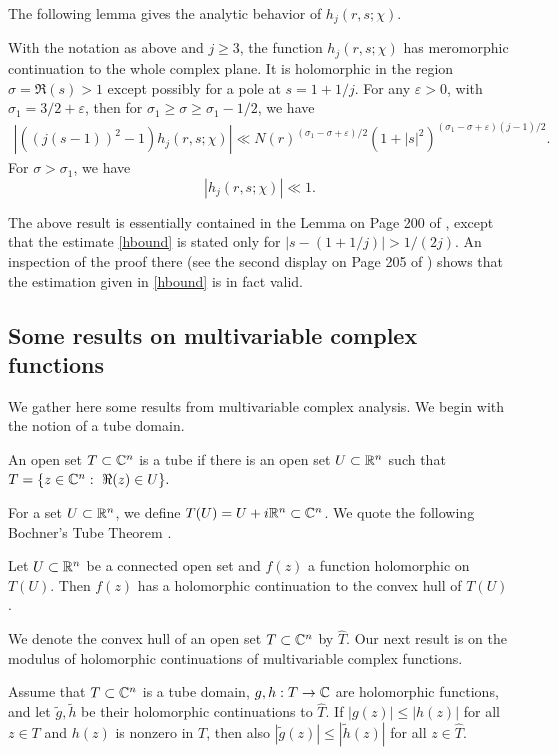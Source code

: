 \documentclass[twoside,leqno,10pt, A4]{amsart}
\begin{document}
    The following lemma gives the analytic behavior of $h_j(r,s;\chi)$.
 \begin{lemma}
\label{lem1} With the notation as above and $j \geq 3$, the function $h_j(r,s;\chi)$ has meromorphic continuation to the whole complex plane. It
is holomorphic in the region $\sigma=\Re(s) > 1$ except possibly for a pole at $s = 1+1/j$. For any $\varepsilon>0$, with $\sigma_1 = 3/2+\varepsilon$,
then for $\sigma_1 \geq \sigma \geq \sigma_1- 1/2$, we have
\begin{align}
\label{hbound}
  |((j(s-1))^2-1)h_j(r,s;\chi)| \ll N(r)^{(\sigma_1-\sigma+\varepsilon)/2}(1+|s|^2)^{(\sigma_1-\sigma+\varepsilon)(j-1)/2}.
\end{align}
  For $\sigma >\sigma_1$, we have
\begin{equation*}
  |h_j(r,s;\chi)| \ll 1.
\end{equation*}
\end{lemma}

The above result is essentially contained in the Lemma on Page 200 of \cite{P}, except that the estimate \eqref{hbound} is stated only for $|s-(1+1/j)|>1/(2j)$.  An inspection of the proof there  (see the second display on Page 205 of \cite{P}) shows that the estimation given in \eqref{hbound} is in fact valid.

\subsection{Some results on multivariable complex functions}
	
We gather here some results from multivariable complex analysis. We begin with the notion of a tube domain.
\begin{defin}
		An open set $T\subset\mathbb C^n$ is a tube if there is an open set $U\subset\mathbb R^n$ such that $T=\{z\in\mathbb C^n:\ \Re(z)\in U\}.$
\end{defin}
	
   For a set $U\subset\mathbb R^n$, we define $T(U)=U+i\mathbb R^n\subset \mathbb C^n$.  We quote the following Bochner's Tube Theorem \cite{Boc}.
\begin{theorem}
\label{Bochner}
		Let $U\subset\mathbb R^n$ be a connected open set and $f(z)$ a function holomorphic on $T(U)$. Then $f(z)$ has a holomorphic continuation to
the convex hull of $T(U)$.
\end{theorem}

 We denote the convex hull of an open set $T\subset\mathbb C^n$ by $\widehat T$.  Our next result is \cite[Proposition C.5]{Cech1} on the modulus of
holomorphic continuations of multivariable complex functions.
\begin{prop}
\label{Extending inequalities}
		Assume that $T\subset \mathbb C^n$ is a tube domain, $g,h:T\rightarrow \mathbb C$ are holomorphic functions, and let $\tilde g,\tilde h$ be their
holomorphic continuations to $\widehat T$. If  $|g(z)|\leq |h(z)|$ for all $z\in T$ and $h(z)$ is nonzero in $T$, then also $|\tilde g(z)|\leq
|\tilde h(z)|$ for all $z\in \widehat T$.
\end{prop}
\end{document}

